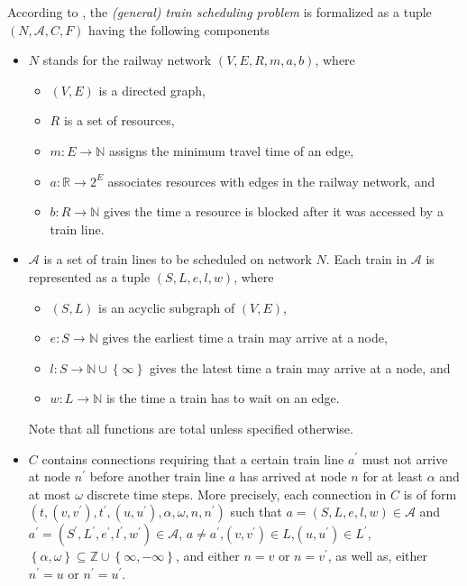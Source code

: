 \documentclass{article}
\begin{document}
According to \cite{DBLP:journals/corr/abs-2003-08598},  the \emph{(general) train scheduling problem} is formalized as a tuple $(N, \mathcal{A}, C, F)$ having the following components
\begin{itemize}
    \item $N$ stands for the railway network $(V, E, R, m, a, b)$, where
        \begin{itemize}
            \item $(V, E)$ is a directed graph,
            \item $R$ is a set of resources,
            \item $m:E\to\mathbb{N}$ assigns the minimum travel time of an edge,
            \item $a: \mathbb{R}\to 2^E$ associates resources with edges in the railway network, and
            \item $b:R\to \mathbb{N}$ gives the time a resource is blocked after it was accessed by a train line.
        \end{itemize}
    \item $\mathcal{A}$ is a set of train lines to be scheduled on network $N$. Each train in $\mathcal{A}$ is represented as a tuple $(S, L, e, l, w)$, where
        \begin{itemize}
            \item $(S, L)$ is an acyclic subgraph of $(V, E)$,
            \item $e:S \to \mathbb{N}$ gives the earliest time a train may arrive at a node,
            \item $l:S\to \mathbb{N} \cup \left\{\infty\right\}$ gives the latest time a train may arrive at a node, and
            \item $w:L\to \mathbb{N}$ is the time a train has to wait on an edge. 
        \end{itemize}
        Note that all functions are total unless specified otherwise.
        \item $C$ contains connections requiring that a certain train line $a^\prime$ must not arrive at node $n^\prime$ before another train line $a $ has arrived at node $n$ for at least $\alpha$ and at most $\omega$ discrete time steps. More precisely, each connection in $C$ is of form $(t,(v, v^\prime), t^\prime,(u, u^\prime), \alpha, \omega, n, n^\prime)$ such that $a= (S, L, e, l, w)\in \mathcal{A}$ and $a^\prime= (S^\prime, L^\prime, e^\prime, l^\prime, w^\prime)\in \mathcal{A}$, $a\not=a^\prime$,$(v, v^\prime)\in L$,$(u, u^\prime)\in L^\prime$,$\left\{\alpha,\omega\right\} \subseteq \mathbb{Z} \cup \left\{\infty,-\infty\right\}$, and either $n=v$ or $n=v^\prime$, as well as, either $n^\prime=u$ or $n^\prime=u^\prime$.

\end{itemize}
\end{document}
